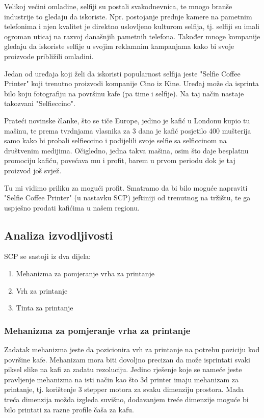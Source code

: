 \documentclass[12pt]{article}
\begin{document}
Velikoj većini omladine, selfiji su postali svakodnevnica, te mnogo branše industrije to gledaju da iskoriste. Npr. postojanje prednje kamere na pametnim telefonima i njen kvalitet je direktno uslovljeno kulturom selfija, tj. selfiji su imali ogroman uticaj na razvoj današnjih pametnih telefona. Također mnoge kompanije gledaju da iskoriste selfije u svojim reklamnim kampanjama kako bi svoje proizvode približili omladini. 

Jedan od uređaja koji želi da iskoristi popularnost selfija jeste "Selfie Coffee Printer" koji trenutno proizvodi kompanije Cino iz Kine. Uređaj može da isprinta bilo koju fotografiju na površinu kafe (pa time i selfije). Na taj način nastaje takozvani "Selfieccino". 

Prateći novinske članke, što se tiče Europe, jedino je kafić u Londonu kupio tu mašinu, te prema tvrdnjama vlasnika za 3 dana je kafić posjetilo 400 mušterija samo kako bi probali selfieccino i podijelili svoje selfie sa selficcinom na društvenim medijima. Očigledno, jedna takva mašina, osim što daje besplatnu promociju kafiću, povećava mu i profit, barem u prvom periodu dok je taj proizvod još svjež.

Tu mi vidimo priliku za mogući profit. Smatramo da bi bilo moguće napraviti "Selfie Coffee Printer" (u nastavku SCP) jeftiniji od trenutnog na tržištu, te ga uspješno prodati kafićima u našem regionu.

\subsection{Analiza izvodljivosti}
SCP se sastoji iz dva dijela:
\begin{enumerate}
\item Mehanizma za pomjeranje vrha za printanje
\item Vrh za printanje
\item Tinta za printanje
\end{enumerate}

\subsubsection{Mehanizma za pomjeranje vrha za printanje}
Zadatak mehanizma jeste da pozicionira vrh za printanje na potrebu poziciju kod površine kafe. Mehanizam mora biti dovoljno precizan da može isprintati svaki piksel slike na kafi za zadatu rezoluciju. Jedino rješenje koje se nameće jeste pravljenje mehanizma na isti način kao što 3d printer imaju mehanizam za printanje, tj. korištenje 3 stepper motora za svaku dimenziju prostora. Mada treća dimenzija možda izgleda suvišno, dodavanjem treće dimenzije moguće bi bilo printati za razne profile čaša za kafu.
\end{document}
